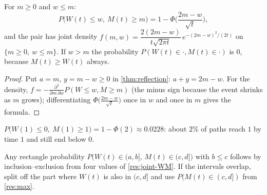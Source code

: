 \begin{result}
\label{res:joint-WM}
For $m\ge0$ and $w\le m$:
\[
  P\big(W(t)\le w,\ M(t)\ge m\big)=1-\Phi\Big(\frac{2m-w}{\sqrt t}\Big),
\]
and the pair has joint density $f(m,w)=\dfrac{2(2m-w)}{t\sqrt{2\pi t}}\,e^{-(2m-w)^2/(2t)}$ on $\{m\ge0,\ w\le m\}$. If $w>m$ the probability $P(W(t)\in\cdot,M(t)\in\cdot)$ is $0$, because $M(t)\ge W(t)$ always.
\end{result}
\begin{proof}
Put $a=m$, $y=m-w\ge0$ in \cref{thm:reflection}: $a+y=2m-w$. For the density, $f=-\frac{\partial^2}{\partial m\,\partial w}P(W\le w,M\ge m)$ (the minus sign because the event shrinks as $m$ grows); differentiating $\Phi\big(\frac{2m-w}{\sqrt t}\big)$ once in $w$ and once in $m$ gives the formula.
\end{proof}

\begin{example}
$P\big(W(1)\le0,\ M(1)\ge1\big)=1-\Phi(2)\approx0.0228$: about $2\%$ of paths reach $1$ by time $1$ and still end below $0$.
\end{example}

\begin{remark}
Any rectangle probability $P\big(W(t)\in(a,b],\,M(t)\in(c,d]\big)$ with $b\le c$ follows by inclusion--exclusion from four values of \cref{res:joint-WM}. If the intervals overlap, split off the part where $W(t)$ is also in $(c,d]$ and use $P(M(t)\in(c,d])$ from \cref{res:max}.
\end{remark}


